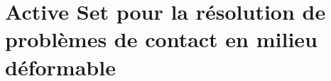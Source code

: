 \chapter{Active Set pour la résolution de problèmes de contact en milieu déformable}\label{chap:active-set-deformable}


\newcommand{\blambda}{\mbox{\boldmath{$\lambda$}}}
\newcommand{\bLambda}{\mbox{\boldmath{$\Lambda$}}}
\newcommand{\bmu}{\mbox{\boldmath{$\mu$}}}
\newcommand{\btheta}{\mbox{\boldmath{$\theta$}}}
\newcommand{\bPi}{\mbox{\boldmath{$\Pi$}}}
\newcommand{\bW}{\mbox{\boldmath{$W$}}}
\newcommand{\bM}{\mbox{\boldmath{$M$}}}
\newcommand{\bN}{\mbox{\boldmath{$N$}}}
\newcommand{\bV}{\mbox{\boldmath{$V$}}}
\newcommand{\bP}{\mbox{\boldmath{$P$}}}
\newcommand{\bS}{\mbox{\boldmath{$S$}}}
\newcommand{\bQ}{\mbox{\boldmath{$Q$}}}
\newcommand{\be}{\mbox{\boldmath{$e$}}}
\newcommand{\bu}{\mbox{\boldmath{$u$}}}
\newcommand{\bU}{\mbox{\boldmath{$U$}}}
\newcommand{\Mb}{\mbox{\boldmath{$M$}}}
\newcommand{\bL}{\mbox{\boldmath{$L$}}}
\newcommand{\bv}{\mbox{\boldmath{$v$}}}
\newcommand{\bn}{\mbox{\boldmath{$n$}}}
\newcommand{\br}{\mbox{\boldmath{$r$}}}
\newcommand{\bw}{\mbox{\boldmath{$w$}}}
\newcommand{\bvs}{\mbox{\boldmath{\footnotesize$v$}}}
\newcommand{\bx}{\mbox{\boldmath{$x$}}}
\newcommand{\bxi}{\mbox{\boldmath{$\xi$}}}
\newcommand{\by}{\mbox{\boldmath{$y$}}}
\newcommand{\bz}{\mbox{\boldmath{$z$}}}
\newcommand{\bF}{\mbox{\boldmath{$F$}}}
\newcommand{\bI}{\mbox{\boldmath{$I$}}}
\newcommand{\bg}{\mbox{\boldmath{$g$}}}
\newcommand{\fb}{\mbox{\boldmath{$f$}}}
\newcommand{\bh}{\mbox{\boldmath{$h$}}}
\newcommand{\bsigma}{\mbox{\boldmath{$\sigma$}}}
\newcommand{\btau}{\mbox{\boldmath{$\tau$}}}
\newcommand{\bvarphi}{\mbox{\boldmath{$\varphi$}}}
\newcommand{\bvarepsilon}{\mbox{\boldmath{$\varepsilon$}}}
\newcommand{\bnu}{\mbox{\boldmath{$\nu$}}}
\newcommand{\beeta}{\mbox{\boldmath{$\eta$}}}
\newcommand{\bzeta}{\mbox{\boldmath{$\zeta$}}}
\newcommand{\bbeta}{\mbox{\boldmath{$\beta$}}}
\newcommand{\bzero}{\mbox{\boldmath{$0$}}}
\newcommand{\bgamma}{\mbox{\boldmath{$\gamma$}}}
\newcommand{\bpsi}{\mbox{\boldmath{$\psi$}}}
\newcommand{\bphi}{\mbox{\boldmath{$\phi$}}}
\newcommand{\T}{\mathcal{T}}
\newcommand{\cG}{\mbox{{${\cal G}$}}}
\newcommand{\RR}{\mathbb{R}}
\newcommand{\PP}{\mathcal{P}}
\newcommand{\btu}{\tilde{\mbox{\boldmath{$u$}}}}
\newcommand{\dual}[2]{\langle #1 \rangle_{#2^*\times#2}}

\newcommand{\cP}{\mbox{{${\cal P}$}}}



\newtheorem{corollary}[theorem]{Corollary}
\newtheorem{proposition}[theorem]{Proposition}

